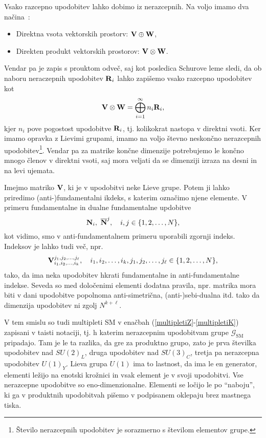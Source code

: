 Vsako razcepno upodobitev lahko dobimo iz nerazcepnih. Na voljo imamo dva načina~\cite{compact}:
\begin{itemize}
	\item{Direktna vsota vektorskih prostorv:} $\mathbf{V} \oplus \mathbf{W}$,
	\item{Direkten produkt vektorskih prostorov:} $\mathbf{V} \otimes \mathbf{W}$.
\end{itemize}
Vendar pa je zapis s prouktom odveč, saj kot posledica Schurove leme sledi, da ob naboru
neraczepnih upodobitev $\mathbf{R}_i$ lahko zapišemo vsako razcepno upodobitev kot~\cite{compact}
\begin{equation}
	\mathbf{V} \otimes \mathbf{W} = \bigoplus_{i = 1}^\infty n_i \mathbf{R}_i,
\end{equation}
kjer $n_i$ pove pogostost upodobitve $\mathbf{R}_i$, tj. kolikokrat nastopa v direktni vsoti. Ker
imamo opravka z Lievimi grupami, imamo na voljo števno neskončno nerazcepnih
upodobitev\footnote{Število nerazcepnih upodobitev je sorazmerno s številom elementov grupe.}. Vendar
pa za matrike končne dimenzije potrebujemo le končno mnogo členov v direktni vsoti, saj mora veljati
da se dimenziji izraza na desni in na levi ujemata.

Imejmo matriko $\mathbf{V}$, ki je v upodobitvi neke Lieve grupe. Potem ji lahko priredimo
(anti-)fundamentalni ikdeks, s katerim označimo njene elemente. V primeru fundamentalne
in dualne fundamentalne updobitve
\begin{equation}
	\mathbf{N}_i,\ \overline{\mathbf{N}}^j, \quad i,j \in \{1,2,\ldots, N\},
\end{equation}
kot vidimo, smo v anti-fundamentalnem primeru uporabili zgornji indeks. Indeksov je lahko tudi več,
npr.
\begin{equation}
	\mathbf{V}_{i_1,i_2,\ldots,i_k}^{j_1,j_2,\ldots,j_\ell}, \quad i_1,i_2,\ldots,i_k,j_1,j_2,
		\ldots,j_\ell
	\in \{1,2,\ldots,N\},
\end{equation}
tako, da ima neka upodobitev hkrati fundamentalne in anti-fundamentalne indekse. Seveda so med
določenimi elementi dodatna pravila, npr. matrika mora biti v dani upodobitve popolnoma
anti-simetrična, (anti-)sebi-dualna itd. tako da dimenzija upodobitev ni zgolj $N^{k+\ell}$.

V tem smislu so tudi multipleti SM v enačbah (\ref{multipletiZ}-\ref{multipletiK}) zapisani v taisti
notaciji, tj. h katerim nerazcepnim upodobitvam grupe $\mathcal{G}_\text{SM}$ pripadajo.
Tam je le ta razlika, da gre za produktno grupo, zato je prva številka upodobitev nad $SU(2)_L$,
druga upodobitev nad $SU(3)_C$, tretja pa nerazcepna upodobitev $U(1)_Y$. Lieva grupa $U(1)$
ima to lastnost, da ima le en generator, elementi ležijo na enotski krožnici in vsak element
je v svoji upodobitvi. Vse nerazcepne upodobitve so eno-dimenzionalne. Elementi se ločijo le po
"`naboju"', ki ga v produktnih upodobitvah pišemo v podpisanem oklepaju brez mastnega tiska.

